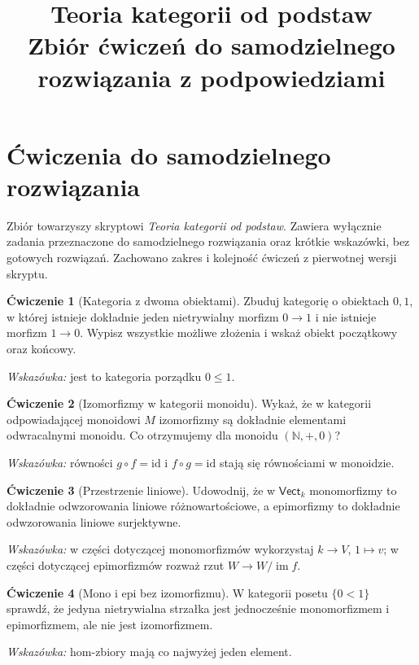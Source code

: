 \documentclass[11pt,a4paper]{article}
\title{\textbf{Teoria kategorii od podstaw}\\\large Zbiór ćwiczeń do samodzielnego rozwiązania z podpowiedziami}
\author{}
\date{}
\numberwithin{equation}{section}
\theoremstyle{plain}
\theoremstyle{definition}
\newtheorem{cwiczenie}{Ćwiczenie}
\theoremstyle{remark}
\newcommand{\cat}[1]{\mathsf{#1}}
\newcommand{\Vect}{\cat{Vect}}
\newcommand{\id}{\mathrm{id}}
\newcommand{\im}{\operatorname{im}}
\begin{document}
\maketitle
\section{Ćwiczenia do samodzielnego rozwiązania}\label{sec:cwiczenia}

Zbiór towarzyszy skryptowi \emph{Teoria kategorii od podstaw}. Zawiera wyłącznie zadania przeznaczone do samodzielnego rozwiązania oraz krótkie wskazówki, bez gotowych rozwiązań. Zachowano zakres i kolejność ćwiczeń z pierwotnej wersji skryptu.

\begin{cwiczenie}[Kategoria z dwoma obiektami]
Zbuduj kategorię o obiektach $0,1$, w której istnieje dokładnie jeden nietrywialny morfizm $0\to1$ i nie istnieje morfizm $1\to0$. Wypisz wszystkie możliwe złożenia i wskaż obiekt początkowy oraz końcowy.

\emph{Wskazówka:} jest to kategoria porządku $0\leq1$.
\end{cwiczenie}

\begin{cwiczenie}[Izomorfizmy w kategorii monoidu]
Wykaż, że w kategorii odpowiadającej monoidowi $M$ izomorfizmy są dokładnie elementami odwracalnymi monoidu. Co otrzymujemy dla monoidu $(\mathbb N,+,0)$?

\emph{Wskazówka:} równości $g\circ f=\id$ i $f\circ g=\id$ stają się równościami w monoidzie.
\end{cwiczenie}

\begin{cwiczenie}[Przestrzenie liniowe]
Udowodnij, że w $\Vect_k$ monomorfizmy to dokładnie odwzorowania liniowe różnowartościowe, a epimorfizmy to dokładnie odwzorowania liniowe surjektywne.

\emph{Wskazówka:} w części dotyczącej monomorfizmów wykorzystaj $k\to V$, $1\mapsto v$; w części dotyczącej epimorfizmów rozważ rzut $W\to W/\im f$.
\end{cwiczenie}

\begin{cwiczenie}[Mono i epi bez izomorfizmu]
W kategorii posetu $\{0<1\}$ sprawdź, że jedyna nietrywialna strzałka jest jednocześnie monomorfizmem i epimorfizmem, ale nie jest izomorfizmem.

\emph{Wskazówka:} hom-zbiory mają co najwyżej jeden element.
\end{cwiczenie}
\end{document}
